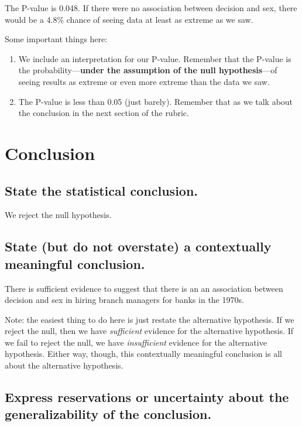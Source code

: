 \documentclass[
]{book}
\begin{document}
The P-value is 0.048. If there were no association between decision and sex, there would be a 4.8\% chance of seeing data at least as extreme as we saw.

Some important things here:

\begin{enumerate}
\def\labelenumi{\arabic{enumi}.}
\item
  We include an interpretation for our P-value. Remember that the P-value is the probability---\textbf{under the assumption of the null hypothesis}---of seeing results as extreme or even more extreme than the data we saw.
\item
  The P-value is less than 0.05 (just barely). Remember that as we talk about the conclusion in the next section of the rubric.
\end{enumerate}

\hypertarget{hypothesis1-ex-ht-conclusion}{%
\section{Conclusion}\label{hypothesis1-ex-ht-conclusion}}

\hypertarget{hypothesis1-ex-stat-conclusion}{%
\subsection{State the statistical conclusion.}\label{hypothesis1-ex-stat-conclusion}}

We reject the null hypothesis.

\hypertarget{hypothesis1-ex-context-conclusion}{%
\subsection{State (but do not overstate) a contextually meaningful conclusion.}\label{hypothesis1-ex-context-conclusion}}

There is sufficient evidence to suggest that there is an an association between decision and sex in hiring branch managers for banks in the 1970s.

Note: the easiest thing to do here is just restate the alternative hypothesis. If we reject the null, then we have \emph{sufficient} evidence for the alternative hypothesis. If we fail to reject the null, we have \emph{insufficient} evidence for the alternative hypothesis. Either way, though, this contextually meaningful conclusion is all about the alternative hypothesis.

\hypertarget{hypothesis1-ex-reservations}{%
\subsection{Express reservations or uncertainty about the generalizability of the conclusion.}\label{hypothesis1-ex-reservations}}
\end{document}
